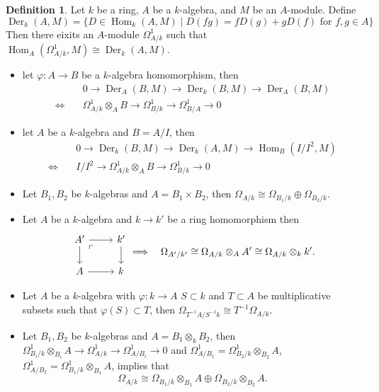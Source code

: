 \documentclass[leqno]{amsart}
\DeclareMathOperator{\Der}{Der}
\newcommand{\1}{\mathbf{1}}
\DeclareMathOperator{\Hom}{Hom}
\theoremstyle{definition}
\newtheorem{defn}[thm]{Definition}
\theoremstyle{remark}
\begin{document}
\begin{defn}
	Let $k$ be a ring, $A$ be a $k$-algebra,
	and $M$ be an $A$-module.
	Define
	\[
		\Der_k(A,M)=
		\{D\in\Hom_k(A,M)\mid 
		D(fg)=fD(g)+gD(f)\text{ for }f,g\in A\}
	\]
	Then there eixits an  $A$-module  $\Omega^1_{A/k}$
	such that $\Hom_A(\Omega^1_{A/k},M)\cong \Der_k(A,M)$.
\end{defn}
\begin{itemize}
	\item let $\varphi\colon A\to B$ be a 
		$k$-algebra homomorphism, then
		\begin{align*}
		&0\to \Der_A(B,M)\to \Der_k(B,M)\to \Der_A(B,M)\\
		\Longleftrightarrow \quad
		&\Omega^1_{A/k}\otimes_AB\to \Omega^1_{B/k}
		\to \Omega^1_{B/A}\to 0
		\end{align*}
	\item let $A$ be a $k$-algebra and  $B=A/I$, then
		\begin{align*}
	&0\to \Der_k(B,M)\to \Der_k(A,M)\to\Hom_B(I/I^2,M)\\
		 \Longleftrightarrow\quad
	&I/I^2\to \Omega^1_{A/k}\otimes_AB\to \Omega^1_{B/k}\to 0
		\end{align*}
	\item Let $B_1,B_2$ be  $k$-algebras and 
		 $A=B_1\times B_2$, then
		 $\Omega_{A/k}\cong
		 \Omega_{B_1/k}\oplus\Omega_{B_2/k}$.
	\item Let $A$ be a $k$-algebra and
	$k\to k'$ be a ring homomorphism then
	\[
		\begin{tikzcd}
			A'
		\arrow[dr, phantom, "\ulcorner", very near start]
		\arrow[d]\arrow[r]& k'\arrow[d]\\
		A\arrow[r]& k
		\end{tikzcd}\Longrightarrow\quad
	\Omega_{A'/k'}\cong
	\Omega_{A/k}\otimes_AA'\cong\Omega_{A/k}\otimes_kk'.
	\]
	\item Let $A$ be a $k$-algebra with $\varphi\colon k\to A$
	$S\subset k$ and $T\subset A$ be multiplicative subsets
	such that $\varphi(S)\subset T$,
	then $\Omega_{T^{-1}A/S^{-1}k}\cong T^{-1}\Omega_{A/k}$.
	\item Let $B_1,B_2$ be $k$-algebras and 
	$A=B_1\otimes_kB_2$, then
	$ \Omega^1_{B_i/k}\otimes_{B_i}A\to 
	\Omega^1_{A/k}\to \Omega^1_{A/B_i} \to0$ and 
	$\Omega^1_{A/B_1}=\Omega^1_{B_{2}/k}\otimes_{B_{2}}A$,
	$\Omega^1_{A/B_2}=\Omega^1_{B_{1}/k}\otimes_{B_{1}}A$,
	implies that
	\[
	\Omega_{A/k}\cong \Omega_{B_1/k}\otimes_{B_1}A\oplus
	\Omega_{B_2/k}\otimes_{B_2}A.
	\]
\end{itemize}
\end{document}
